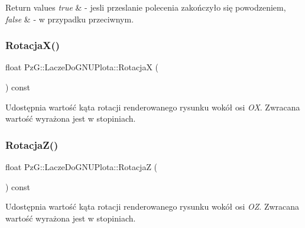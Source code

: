 \begin{DoxyRetVals}{Return values}
{\em true} & -\/ jesli przeslanie polecenia zakończyło się powodzeniem, \\
\hline
{\em false} & -\/ w przypadku przeciwnym. \\
\hline
\end{DoxyRetVals}
\mbox{\label{classPzG_1_1LaczeDoGNUPlota_addf0b844f626f3f5220de70efcbbdbb3}} 
\subsubsection{\texorpdfstring{Rotacja\+X()}{RotacjaX()}}
{\footnotesize\ttfamily float Pz\+G\+::\+Lacze\+Do\+G\+N\+U\+Plota\+::\+RotacjaX (\begin{DoxyParamCaption}{ }\end{DoxyParamCaption}) const\hspace{0.3cm}{\ttfamily [inline]}}

Udostępnia wartość kąta rotacji renderowanego rysunku wokół osi {\itshape OX}. Zwracana wartość wyrażona jest w stopiniach. \mbox{\label{classPzG_1_1LaczeDoGNUPlota_a9dac73754fab10644b287756003e9c79}} 
\subsubsection{\texorpdfstring{Rotacja\+Z()}{RotacjaZ()}}
{\footnotesize\ttfamily float Pz\+G\+::\+Lacze\+Do\+G\+N\+U\+Plota\+::\+RotacjaZ (\begin{DoxyParamCaption}{ }\end{DoxyParamCaption}) const\hspace{0.3cm}{\ttfamily [inline]}}

Udostępnia wartość kąta rotacji renderowanego rysunku wokół osi {\itshape OZ}. Zwracana wartość wyrażona jest w stopiniach. \mbox{\label{classPzG_1_1LaczeDoGNUPlota_a065f5b8402737cc62b0ad4f66d028335}} 
